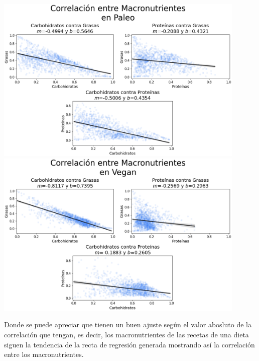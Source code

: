 \documentclass[12pt,a4paper]{article}
\begin{document}
{{\begin{center}
                \includegraphics[width=0.9\textwidth]{Resources/Bivariado/RegressionPaleo.png}\\
                \includegraphics[width=0.9\textwidth]{Resources/Bivariado/RegressionVegan.png}
            \end{center}

            Donde se puede apreciar que tienen un buen ajuste según el valor abosluto de la 
            correlación que tengan, es decir, los macronutrientes de las recetas de una dieta 
            siguen la tendencia de la recta de regresión generada mostrando así la correlación 
            entre los macronutrientes.
        }
    }

    \newpage
\end{document}
